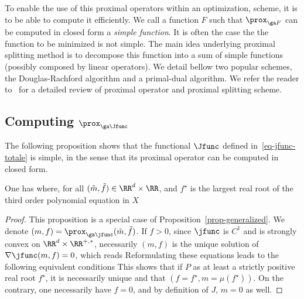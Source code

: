 To enable the use of this proximal operators within an optimization, scheme, it is to be able to compute it efficiently. We call a function $F$ such that $\prox_{\ga F}$ can be computed in closed form a \textit{simple function}. It is often the case the the function to be minimized is not simple. The main idea underlying proximal splitting method is to decompose this function into a sum of simple functions (possibly composed by linear operators). We detail bellow two popular schemes, the Douglas-Rachford algorithm and a primal-dual algorithm.  We refer the reader to~\cite{combettes-pesquet-review} for a detailed review of proximal operator and proximal splitting scheme. 


\subsection{Computing $\prox_{\ga \Jfunc}$}

The following proposition shows that the functional $\Jfunc$ defined in~\eqref{eq-jfunc-totale} is simple, in the sense that its proximal operator can be computed in closed form. 

\begin{prop}\label{proposition1}
	One has
	where, for all $(\tilde m,\tilde f) \in \RR^d \times \RR$, 
	and $f^\star$ is the largest real root of the third order polynomial equation in $X$
\end{prop}
\begin{proof}
	This proposition is a special case of Proposition~\ref{prop-generalized}. 
	We denote $(m,f) = \prox_{\ga \jfunc}(\tilde m,\tilde f)$. 
	If $f > 0$, since $\jfunc$ is $C^1$ and is strongly convex on $\RR^d \times \RR^{+,*}$, necessarily $(m,f)$ is the unique solution of $\nabla \jfunc(m,f)=0$, which reads
	Reformulating these equations leads to the following equivalent conditions
	This shows that if $P$ as at least a strictly positive real root $f^\star$, it is necessarily unique and that $(f=f^\star,m=\mu(f^\star))$.
	On the contrary, one necessarily have $f=0$, and by definition of $J$, $m=0$ as well.
\fi
\end{proof}


